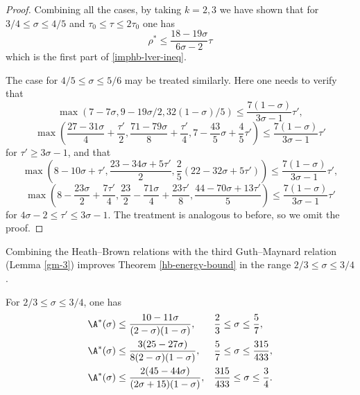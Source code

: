 \begin{proof}
Combining all the cases, by taking $k= 2,3$ we have shown that for $3/4 \le \sigma \le 4/5$ and $\tau_0 \le \tau \le 2\tau_0$ one has
\[
\rho^* \le \frac{18 - 19\sigma}{6\sigma - 2}\tau
\]
which is the first part of \eqref{imphb-lver-ineq}.

The case for $4/5 \le \sigma \le 5/6$ may be treated similarly. Here one needs to verify that
\[
\max(7 - 7\sigma, 9 - 19\sigma/2, 32(1 - \sigma)/5) \le \frac{7(1 - \sigma)}{3\sigma - 1}\tau',
\]
\[
\max\left(\frac{27-31\sigma}{4} + \frac{\tau'}{2}, \frac{71-79\sigma}{8}+\frac{\tau'}{4}, 7-\frac{43}{5}\sigma + \frac{4}{5}\tau'\right) \le \frac{7(1 - \sigma)}{3\sigma - 1}\tau'
\]
for $\tau' \ge 3\sigma - 1$, and that
\[
\max\left(8 -10\sigma + \tau',\frac{23 - 34\sigma + 5\tau'}{2}, \frac{2}{5}(22 - 32\sigma +  5\tau')\right) \le \frac{7(1 - \sigma)}{3\sigma - 1}\tau',
\]
\[
\max\left(8 - \frac{23\sigma}{2} + \frac{7\tau'}{4}, \frac{23}{2} - \frac{71\sigma}{4} + \frac{23\tau'}{8}, \frac{44 - 70\sigma + 13\tau'}{5}\right) \le \frac{7(1 - \sigma)}{3\sigma - 1}\tau'
\]
for $4\sigma - 2 \le \tau' \le 3\sigma - 1$. The treatment is analogous to before, so we omit the proof.
\end{proof}

Combining the Heath--Brown relations with the third Guth--Maynard relation (Lemma \ref{gm-3}) improves Theorem \ref{hb-energy-bound} in the range $2/3 \le \sigma \le 3/4$.

\begin{theorem}\label{imp-energy-bound1}
For $2/3 \le \sigma \le 3/4$, one has
\begin{align*}
\A^*(\sigma) &\le \frac{10 - 11\sigma}{(2 - \sigma)(1 - \sigma)}, && \frac{2}{3} \le \sigma \le \frac{5}{7},\\
\A^*(\sigma) &\le \frac{3(25 - 27\sigma)}{8(2 - \sigma)(1 - \sigma)}, && \frac{5}{7} \le \sigma \le \frac{315}{433},\\
\A^*(\sigma) &\le \frac{2(45 - 44\sigma)}{(2\sigma + 15)(1 - \sigma)}, && \frac{315}{433} \le \sigma \le \frac{3}{4}.
\end{align*}
\end{theorem}

\derived
{}

